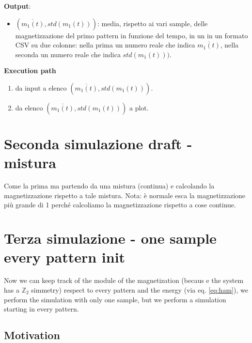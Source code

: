 \documentclass[a4paper,10pt]{article}
\begin{document}
\textbf{Output}:
\begin{itemize}
 \item $(\overline{m_1(t)}, std(m_1(t)))$: media, rispetto ai vari sample, delle magnetizzazione del primo pattern in funzione del tempo, in un in un formato CSV su due colonne: nella prima un numero reale che indica $\overline{m_1(t)}$, nella seconda un numero reale che indica $std(m_1(t)))$.
\end{itemize}

\textbf{Execution path}
\begin{enumerate}
 \item da input a elenco $(\overline{m_1(t)}, std(m_1(t)))$.
 \item da elenco $(\overline{m_1(t)}, std(m_1(t)))$ a plot.
\end{enumerate}

\section{Seconda simulazione draft - mistura}

Come la prima ma partendo da una mistura (continua) e calcolando la magnetizzazione rispetto a tale mistura.
Nota: è normale esca la magnetizzazione più grande di 1 perché calcoliamo la magnetizzazione rispetto a cose continue.

\section{Terza simulazione - one sample every pattern init}

Now we can keep track of the module of the magnetization (becaus e the system has a $\mathbb{Z}_2$ simmetry) respect to every pattern and the energy (via eq. \ref{eq:ham}), we perform the simulation with only one sample, but we perform a simulation starting in every pattern.

\subsection{Motivation}
\end{document}
